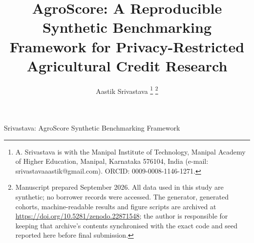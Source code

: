 \documentclass[journal]{IEEEtran}
\begin{document}
\title{AgroScore: A Reproducible Synthetic Benchmarking Framework for Privacy-Restricted Agricultural Credit Research}

\author{Aastik Srivastava%
\thanks{A. Srivastava is with the Manipal Institute of Technology, Manipal Academy of Higher Education, Manipal, Karnataka 576104, India (e-mail: srivastavaaastik@gmail.com). ORCID: 0009-0008-1146-1271.}%
\thanks{Manuscript prepared September 2026. All data used in this study are synthetic; no borrower records were accessed. The generator, generated cohorts, machine-readable results and figure scripts are archived at \url{https://doi.org/10.5281/zenodo.22871548}; the author is responsible for keeping that archive's contents synchronised with the exact code and seed reported here before final submission.}}

%
{Srivastava: AgroScore Synthetic Benchmarking Framework}

\maketitle
\end{document}
